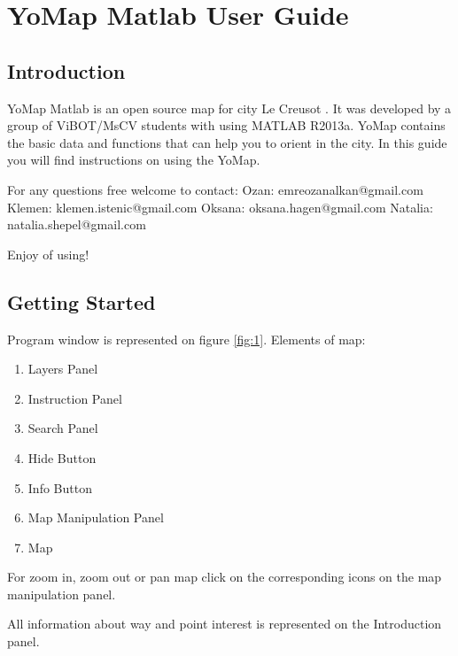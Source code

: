
\chapter{YoMap Matlab User Guide} %

\label{Chapter9} %



\section{Introduction}
	YoMap Matlab is an open source map for city Le Creusot . It was developed by a group of ViBOT/MsCV students with using MATLAB R2013a. YoMap contains the basic data and functions that can help you to orient in the city. In this guide you will find instructions on using the YoMap.
	
For any questions free welcome to contact:
Ozan: emreozanalkan@gmail.com
Klemen: klemen.istenic@gmail.com 
Oksana:	oksana.hagen@gmail.com
Natalia: natalia.shepel@gmail.com
\begin{center}
Enjoy of using!
\end{center}

	
\section{Getting Started}
	Program window is represented on figure \ref{fig:1}. Elements of map:
	\begin{enumerate}
		\item Layers Panel
		\item Instruction Panel
		\item Search Panel
		\item Hide Button
		\item Info Button
		\item Map Manipulation Panel
		\item Map
	\end{enumerate}
	
	For zoom in, zoom out or pan map click on the corresponding icons on the map manipulation panel. 
	
	All information about way and point interest is represented on the Introduction panel. 
	
